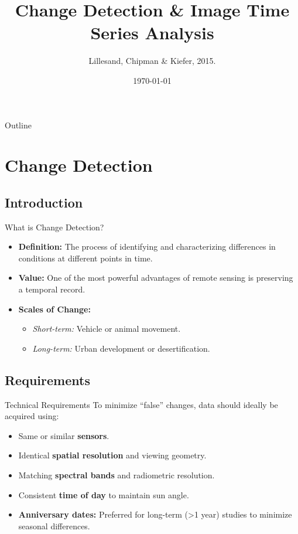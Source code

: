 \documentclass[aspectratio=169]{beamer}
\title[Class 06]{Change Detection \& Image Time Series Analysis}
\author{Lillesand, Chipman \& Kiefer, 2015.}
\date{\today}
\begin{document}
\frame{\titlepage}

\begin{frame}{Outline}
    \tableofcontents
\end{frame}

\section{Change Detection}

\subsection{Introduction}

\begin{frame}{What is Change Detection?}
    \begin{itemize}
        \item \textbf{Definition:} The process of identifying and characterizing differences in conditions at different points in time.
        \item \textbf{Value:} One of the most powerful advantages of remote sensing is preserving a temporal record.
        \item \textbf{Scales of Change:}
        \begin{itemize}
            \item \textit{Short-term:} Vehicle or animal movement.
            \item \textit{Long-term:} Urban development or desertification.
        \end{itemize}
    \end{itemize}
\end{frame}

\subsection{Requirements}

\begin{frame}{Technical Requirements}
    To minimize ``false'' changes, data should ideally be acquired using:
    \begin{itemize}
        \item Same or similar \textbf{sensors}.
        \item Identical \textbf{spatial resolution} and viewing geometry.
        \item Matching \textbf{spectral bands} and radiometric resolution.
        \item Consistent \textbf{time of day} to maintain sun angle.
        \item \textbf{Anniversary dates:} Preferred for long-term (>1 year) studies to minimize seasonal differences.
    \end{itemize}
\end{frame}
\end{document}
